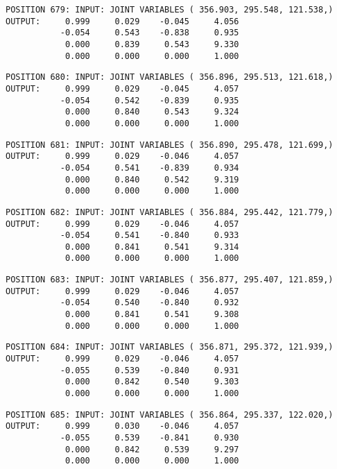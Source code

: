 \begin{verbatim}
POSITION 679: INPUT: JOINT VARIABLES ( 356.903, 295.548, 121.538,)
OUTPUT:     0.999     0.029    -0.045     4.056
           -0.054     0.543    -0.838     0.935
            0.000     0.839     0.543     9.330
            0.000     0.000     0.000     1.000
\end{verbatim} \pagebreak[1]\begin{verbatim}
POSITION 680: INPUT: JOINT VARIABLES ( 356.896, 295.513, 121.618,)
OUTPUT:     0.999     0.029    -0.045     4.057
           -0.054     0.542    -0.839     0.935
            0.000     0.840     0.543     9.324
            0.000     0.000     0.000     1.000
\end{verbatim} \pagebreak[1]\begin{verbatim}
POSITION 681: INPUT: JOINT VARIABLES ( 356.890, 295.478, 121.699,)
OUTPUT:     0.999     0.029    -0.046     4.057
           -0.054     0.541    -0.839     0.934
            0.000     0.840     0.542     9.319
            0.000     0.000     0.000     1.000
\end{verbatim} \pagebreak[1]\begin{verbatim}
POSITION 682: INPUT: JOINT VARIABLES ( 356.884, 295.442, 121.779,)
OUTPUT:     0.999     0.029    -0.046     4.057
           -0.054     0.541    -0.840     0.933
            0.000     0.841     0.541     9.314
            0.000     0.000     0.000     1.000
\end{verbatim} \pagebreak[1]\begin{verbatim}
POSITION 683: INPUT: JOINT VARIABLES ( 356.877, 295.407, 121.859,)
OUTPUT:     0.999     0.029    -0.046     4.057
           -0.054     0.540    -0.840     0.932
            0.000     0.841     0.541     9.308
            0.000     0.000     0.000     1.000
\end{verbatim} \pagebreak[1]\begin{verbatim}
POSITION 684: INPUT: JOINT VARIABLES ( 356.871, 295.372, 121.939,)
OUTPUT:     0.999     0.029    -0.046     4.057
           -0.055     0.539    -0.840     0.931
            0.000     0.842     0.540     9.303
            0.000     0.000     0.000     1.000
\end{verbatim} \pagebreak[1]\begin{verbatim}
POSITION 685: INPUT: JOINT VARIABLES ( 356.864, 295.337, 122.020,)
OUTPUT:     0.999     0.030    -0.046     4.057
           -0.055     0.539    -0.841     0.930
            0.000     0.842     0.539     9.297
            0.000     0.000     0.000     1.000
\end{verbatim} \pagebreak[1]\begin{verbatim}

\end{verbatim}
